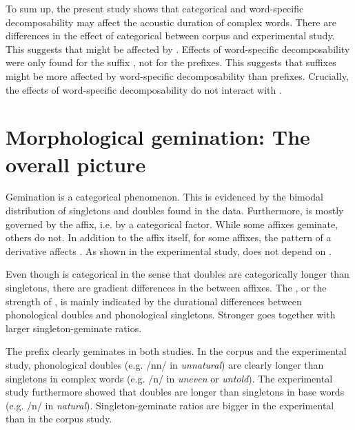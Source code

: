 To sum up, the present study shows that categorical  and word-specific decomposability may affect the {acoustic duration} of complex words.
 There are differences in the effect of categorical  between corpus and experimental study. This suggests
that  might be affected by . 
Effects of word-specific decomposability were only found for the suffix , not for the prefixes. This suggests that suffixes might be more affected by word-specific decomposability than prefixes.
 Crucially, the effects of word-specific decomposability do not interact with . 




\section{Morphological gemination: The overall picture}

Gemination is a categorical phenomenon. This is evidenced by the bimodal distribution of singletons and doubles found in the data. Furthermore,  is mostly governed by the affix, i.e. by a categorical factor. While some affixes geminate, others do not. In addition to the affix itself, for some affixes, the  pattern of a derivative affects . 
As shown in the experimental study,  does not depend on .

Even though  is categorical in the sense that doubles are categorically longer than singletons, there are gradient differences in the  between affixes. The , or the strength of , is mainly indicated by the durational differences between phonological doubles and phonological singletons. Stronger  goes together with larger singleton-geminate ratios. 


The prefix  clearly geminates in both studies. In the corpus and the experimental study, phonological doubles (e.g. /nn/ in \textit{unnatural}) are clearly longer than singletons in complex words (e.g. /n/ in \textit{uneven} or \textit{untold}). The experimental study furthermore showed that doubles are longer than singletons in base words  (e.g. /n/ in \textit{natural}). Singleton-geminate ratios are bigger in the experimental than in the corpus study.

